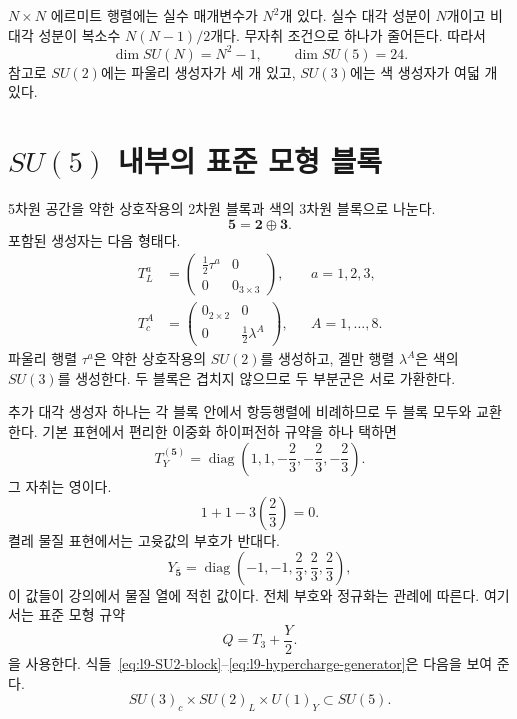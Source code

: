 \(N\times N\) 에르미트 행렬에는 실수 매개변수가 \(N^2\)개 있다. 실수 대각 성분이 \(N\)개이고 비대각 성분이 복소수 \(N(N-1)/2\)개다. 무자취 조건으로 하나가 줄어든다. 따라서
\begin{equation}
\dim SU(N)=N^2-1,
\qquad
\dim SU(5)=24.
\label{eq:l9-SU5-dimension}
\end{equation}
참고로 \(SU(2)\)에는 파울리 생성자가 세 개 있고, \(SU(3)\)에는 색 생성자가 여덟 개 있다.

\section{\texorpdfstring{\(SU(5)\)}{SU(5)} 내부의 표준 모형 블록}

5차원 공간을 약한 상호작용의 2차원 블록과 색의 3차원 블록으로 나눈다.
\begin{equation}
\mathbf5=\mathbf2\oplus\mathbf3.
\end{equation}
포함된 생성자는 다음 형태다.
\begin{align}
T^a_L
&=
\begin{pmatrix}
\tfrac12\tau^a&0\\
0&0_{3\times3}
\end{pmatrix},
&& a=1,2,3,
\label{eq:l9-SU2-block}\\
T^A_c
&=
\begin{pmatrix}
0_{2\times2}&0\\
0&\tfrac12\lambda^A
\end{pmatrix},
&& A=1,\ldots,8.
\label{eq:l9-SU3-block}
\end{align}
파울리 행렬 \(\tau^a\)은 약한 상호작용의 \(SU(2)\)를 생성하고, 겔만 행렬 \(\lambda^A\)은 색의 \(SU(3)\)를 생성한다. 두 블록은 겹치지 않으므로 두 부분군은 서로 가환한다.

추가 대각 생성자 하나는 각 블록 안에서 항등행렬에 비례하므로 두 블록 모두와 교환한다. 기본 표현에서 편리한 이중화 하이퍼전하 규약을 하나 택하면
\begin{equation}
T_Y^{(\mathbf5)}=
\operatorname{diag}
\left(
1,1,-\frac23,-\frac23,-\frac23
\right).
\label{eq:l9-hypercharge-generator}
\end{equation}
그 자취는 영이다.
\begin{equation}
1+1-3\left(\frac23\right)=0.
\end{equation}
켤레 물질 표현에서는 고윳값의 부호가 반대다.
\begin{equation}
Y_{\overline{\mathbf5}}
=
\operatorname{diag}
\left(
-1,-1,\frac23,\frac23,\frac23
\right),
\label{eq:l9-fivebar-hypercharge}
\end{equation}
이 값들이 강의에서 물질 열에 적힌 값이다. 전체 부호와 정규화는 관례에 따른다. 여기서는 표준 모형 규약
\begin{equation}
Q=T_3+\frac{Y}{2}.
\label{eq:l9-charge}
\end{equation}
을 사용한다. 식들~\eqref{eq:l9-SU2-block}--\eqref{eq:l9-hypercharge-generator}은 다음을 보여 준다.
\begin{equation}
SU(3)_c\times SU(2)_L\times U(1)_Y
\subset SU(5).
\end{equation}

